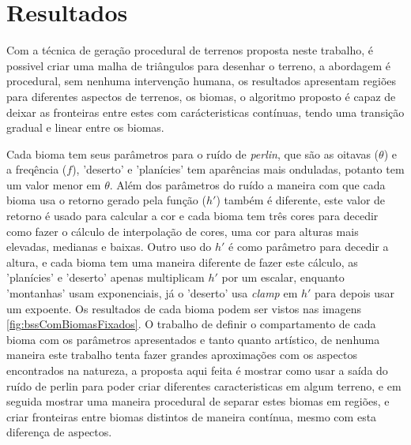 \chapter{Resultados}
Com a técnica de geração procedural de terrenos proposta neste trabalho, é possivel criar uma 
malha de triângulos para desenhar o terreno, a abordagem é procedural, sem nenhuma 
intervenção humana, os resultados apresentam regiões para diferentes aspectos de terrenos,
os biomas, o algoritmo proposto é capaz de deixar as fronteiras entre estes com carácteristicas 
contínuas, tendo uma transição gradual e linear entre os biomas.

Cada bioma tem seus parâmetros para o ruído de \textit{perlin}, que são as oitavas ($\theta$)
e a freqência ($f$), 'deserto' e 'planícies' tem aparências mais onduladas, potanto tem
um valor menor em $\theta$. Além dos parâmetros do ruído a maneira com que cada 
bioma usa o retorno gerado pela função ($h'$) também é diferente, este valor de retorno
é usado para calcular a cor e cada bioma tem três cores para decedir como fazer o cálculo de interpolação
de cores, uma cor para alturas mais elevadas, medianas e baixas. Outro uso do $h'$
é como parâmetro para decedir a altura, e cada bioma tem uma maneira diferente de fazer
este cálculo, as 'planícies' e 'deserto' apenas multiplicam $h'$ por um escalar, enquanto
'montanhas' usam exponenciais, já o 'deserto' usa \textit{clamp} em $h'$ para depois
usar um expoente. Os resultados de cada bioma podem ser vistos nas imagens \ref{fig:bssComBiomasFixados}.
O trabalho de definir o compartamento de cada bioma com os parâmetros apresentados 
e tanto quanto artístico, de nenhuma maneira este trabalho tenta fazer grandes aproximações
com os aspectos encontrados na natureza, a proposta aqui feita é mostrar como usar
a saída do ruído de perlin para poder criar diferentes caracteristicas em algum terreno, e em 
seguida mostrar uma maneira procedural de separar estes biomas em regiões, e criar fronteiras
entre biomas distintos de maneira contínua, mesmo com esta diferença de aspectos.

